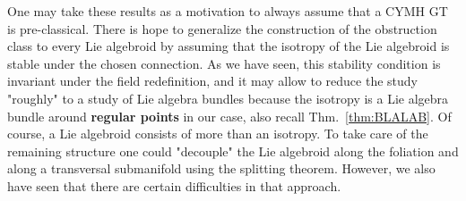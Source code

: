 %
%
%
One may take these results as a motivation to always assume that a CYMH GT is pre-classical. 
There is hope to generalize the construction of the obstruction class to every Lie algebroid by assuming that the isotropy of the Lie algebroid is stable under the chosen connection. As we have seen, this stability condition is invariant under the field redefinition, and it may allow to reduce the study "roughly" to a study of Lie algebra bundles because the isotropy is a Lie algebra bundle around \textbf{regular points} in our case, also recall Thm.~\ref{thm:BLALAB}. Of course, a Lie algebroid consists of more than an isotropy. To take care of the remaining structure one could "decouple" the Lie algebroid along the foliation and along a transversal submanifold using the splitting theorem. However, we also have seen that there are certain difficulties in that approach.

